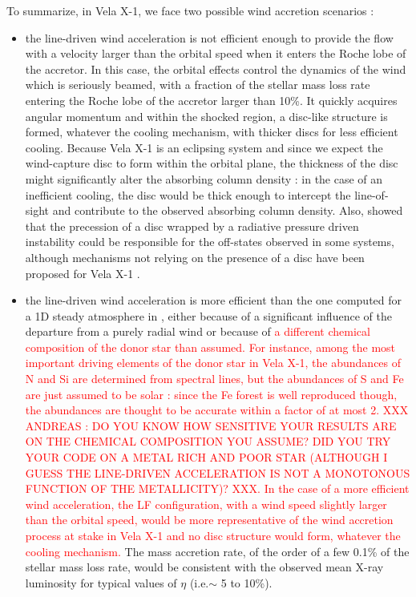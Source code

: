 \documentclass{aa}
\makeatletter
\newcommand*{\eg}{e.g.\@\xspace}
\newcommand*{\ie}{i.e.\@\xspace}
\makeatother
\begin{document}
To summarize, in Vela X-1, we face two possible wind accretion scenarios :
\begin{itemize}
\item the line-driven wind acceleration is not efficient enough to provide the flow with a velocity larger than the orbital speed when it enters the Roche lobe of the accretor. In this case, the orbital effects control the dynamics of the wind which is seriously beamed, with a fraction of the stellar mass loss rate entering the Roche lobe of the accretor larger than 10\%. It quickly acquires angular momentum and within the shocked region, a disc-like structure is formed, whatever the cooling mechanism, with thicker discs for less efficient cooling. Because Vela X-1 is an eclipsing system and since we expect the wind-capture disc to form within the orbital plane, the thickness of the disc might significantly alter the absorbing column density : in the case of an inefficient cooling, the disc would be thick enough to intercept the line-of-sight and contribute to the observed absorbing column density. Also, \cite{Foulkes:2010wa} showed that the precession of a disc wrapped by a radiative pressure driven instability \citep{Petterson1977a,Petterson1977} could be responsible for the off-states observed in some systems, although mechanisms not relying on the presence of a disc have been proposed for Vela X-1 \citep[see \eg][]{Manousakis2015c}.
\item the line-driven wind acceleration is more efficient than the one computed for a 1D steady atmosphere in \cite{Sander2017}, either because of a significant influence of the departure from a purely radial wind or because of \textcolor{red}{a different chemical composition of the donor star than assumed. For instance, among the most important driving elements of the donor star in Vela X-1, the abundances of N and Si are determined from spectral lines, but the abundances of S and Fe are just assumed to be solar \citep{Gimenez-Garcia2016} : since the Fe forest is well reproduced though, the abundances are thought to be accurate within a factor of at most 2.
 XXX ANDREAS : DO YOU KNOW HOW SENSITIVE YOUR RESULTS ARE ON THE CHEMICAL COMPOSITION YOU ASSUME? DID YOU TRY YOUR CODE ON A METAL RICH AND POOR STAR (ALTHOUGH I GUESS THE LINE-DRIVEN ACCELERATION IS NOT A MONOTONOUS FUNCTION OF THE METALLICITY)? XXX. In the case of a more efficient wind acceleration, the LF configuration, with a wind speed slightly larger than the orbital speed, would be more representative of the wind accretion process at stake in Vela X-1 and no disc structure would form, whatever the cooling mechanism.} The mass accretion rate, of the order of a few 0.1\% of the stellar mass loss rate, would be consistent with the observed mean X-ray luminosity for typical values of $\eta$ (\ie $\sim$ 5 to 10\%).
\end{itemize}
\end{document}
